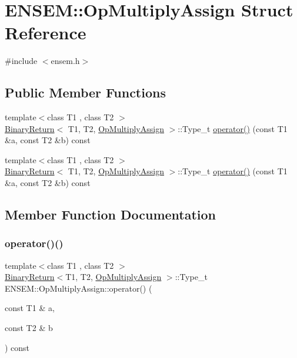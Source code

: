 \hypertarget{structENSEM_1_1OpMultiplyAssign}{}\section{E\+N\+S\+EM\+:\+:Op\+Multiply\+Assign Struct Reference}
\label{structENSEM_1_1OpMultiplyAssign}


{\ttfamily \#include $<$ensem.\+h$>$}

\subsection*{Public Member Functions}
\begin{DoxyCompactItemize}
\item 
{\footnotesize template$<$class T1 , class T2 $>$ }\\\mbox{\hyperlink{structENSEM_1_1BinaryReturn}{Binary\+Return}}$<$ T1, T2, \mbox{\hyperlink{structENSEM_1_1OpMultiplyAssign}{Op\+Multiply\+Assign}} $>$\+::Type\+\_\+t \mbox{\hyperlink{structENSEM_1_1OpMultiplyAssign_a066c102dbdd6eade3f255958de954a16}{operator()}} (const T1 \&a, const T2 \&b) const
\item 
{\footnotesize template$<$class T1 , class T2 $>$ }\\\mbox{\hyperlink{structENSEM_1_1BinaryReturn}{Binary\+Return}}$<$ T1, T2, \mbox{\hyperlink{structENSEM_1_1OpMultiplyAssign}{Op\+Multiply\+Assign}} $>$\+::Type\+\_\+t \mbox{\hyperlink{structENSEM_1_1OpMultiplyAssign_a066c102dbdd6eade3f255958de954a16}{operator()}} (const T1 \&a, const T2 \&b) const
\end{DoxyCompactItemize}


\subsection{Member Function Documentation}
\mbox{\label{structENSEM_1_1OpMultiplyAssign_a066c102dbdd6eade3f255958de954a16}} 
\subsubsection{\texorpdfstring{operator()()}{operator()()}\hspace{0.1cm}{\footnotesize\ttfamily [1/2]}}
{\footnotesize\ttfamily template$<$class T1 , class T2 $>$ \\
\mbox{\hyperlink{structENSEM_1_1BinaryReturn}{Binary\+Return}}$<$T1, T2, \mbox{\hyperlink{structENSEM_1_1OpMultiplyAssign}{Op\+Multiply\+Assign}} $>$\+::Type\+\_\+t E\+N\+S\+E\+M\+::\+Op\+Multiply\+Assign\+::operator() (\begin{DoxyParamCaption}\item[{const T1 \&}]{a,  }\item[{const T2 \&}]{b }\end{DoxyParamCaption}) const\hspace{0.3cm}{\ttfamily [inline]}}

